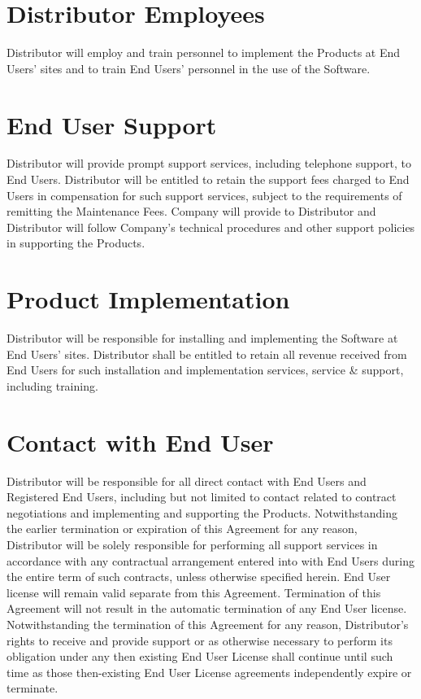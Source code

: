 \documentclass[letterpaper,10pt,english]{sphinxmanual}
\begin{document}
\section{Distributor Employees}
\label{\detokenize{additionalresponsibilities2:distributor-employees}}
Distributor will employ and train personnel to implement the Products at End Users’ sites and to train End Users’ personnel in the use of the Software.


\section{End User Support}
\label{\detokenize{additionalresponsibilities2:end-user-support}}
Distributor will provide prompt support services, including telephone support, to End Users. Distributor will be entitled to retain the support fees charged to End Users in compensation for such support services, subject to the requirements of remitting the Maintenance Fees. Company will provide to Distributor and Distributor will follow Company’s technical procedures and other support policies in supporting the Products.


\section{Product Implementation}
\label{\detokenize{additionalresponsibilities2:product-implementation}}
Distributor will be responsible for installing and implementing the Software at End Users’ sites. Distributor shall be entitled to retain all revenue received from End Users for such installation and implementation services, service \& support, including training.


\section{Contact with End User}
\label{\detokenize{additionalresponsibilities2:contact-with-end-user}}
Distributor will be responsible for all direct contact with End Users and Registered End Users, including but not limited to contact related to contract negotiations and implementing and supporting the Products. Notwithstanding the earlier termination or expiration of this Agreement for any reason, Distributor will be solely responsible for performing all support services in accordance with any contractual arrangement entered into with End Users during the entire term of such contracts, unless otherwise specified herein.  End User license will remain valid separate from this Agreement.  Termination of this Agreement will not result in the automatic termination of any End User license.  Notwithstanding the termination of this Agreement for any reason, Distributor’s rights to receive and provide support or as otherwise necessary to perform its obligation under any then \textendash{} existing End User License shall continue until such time as those then-existing End User License agreements independently expire or terminate.
\end{document}
